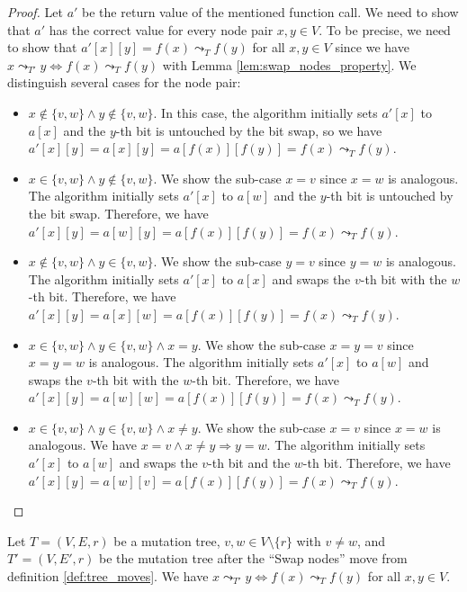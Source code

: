 \begin{proof}
    Let $a'$ be the return value of the mentioned function call. We need to show that $a'$ has the correct value for every node pair $x, y \in V$. To be precise, we need to show that $a'[x][y] = f(x) \leadsto_T f(y)$ for all $x, y \in V$ since we have $x \leadsto_{T'} y \Leftrightarrow f(x) \leadsto_T f(y)$ with Lemma \ref{lem:swap_nodes_property}. We distinguish several cases for the node pair:
    \begin{itemize}
        \item $x \notin \{v, w\} \wedge y \notin \{v, w\}$. In this case, the algorithm initially sets $a'[x]$ to $a[x]$ and the $y$-th bit is untouched by the bit swap, so we have $a'[x][y] = a[x][y] = a[f(x)][f(y)] = f(x) \leadsto_T f(y)$.
        
        \item $x \in \{v, w\} \wedge y \notin \{v, w\}$. We show the sub-case $x = v$ since $x = w$ is analogous. The algorithm initially sets $a'[x]$ to $a[w]$ and the $y$-th bit is untouched by the bit swap. Therefore, we have $a'[x][y] = a[w][y] = a[f(x)][f(y)] = f(x) \leadsto_T f(y)$.
        
        \item $x \notin \{v, w\} \wedge y \in \{v, w\}$. We show the sub-case $y = v$ since $y = w$ is analogous. The algorithm initially sets $a'[x]$ to $a[x]$ and swaps the $v$-th bit with the $w$-th bit. Therefore, we have $a'[x][y] = a[x][w] = a[f(x)][f(y)] = f(x) \leadsto_T f(y)$.
        
        \item $x \in \{v, w\} \wedge y \in \{v, w\} \wedge x = y$. We show the sub-case $x = y = v$ since $x = y = w$ is analogous. The algorithm initially sets $a'[x]$ to $a[w]$ and swaps the $v$-th bit with the $w$-th bit. Therefore, we have $a'[x][y] = a[w][w] = a[f(x)][f(y)] = f(x) \leadsto_T f(y)$.
        
        \item $x \in \{v, w\} \wedge y \in \{v, w\} \wedge x \neq y$. We show the sub-case $x = v$ since $x = w$ is analogous. We have $x = v \wedge x \neq y \Rightarrow y = w$. The algorithm initially sets $a'[x]$ to $a[w]$ and swaps the $v$-th bit and the $w$-th bit. Therefore, we have $a'[x][y] = a[w][v] = a[f(x)][f(y)] = f(x) \leadsto_T f(y)$.
    \end{itemize}
\end{proof}

\begin{lemma}
    \label{lem:swap_nodes_property}
    Let $T = (V, E, r)$ be a mutation tree, $v, w \in V \setminus \{r\}$ with $v \neq w$, and $T' = (V, E', r)$ be the mutation tree after the ``Swap nodes'' move from definition \ref{def:tree_moves}. We have $x \leadsto_{T'} y \Leftrightarrow f(x) \leadsto_T f(y)$ for all $x, y \in V$.
\end{lemma}

